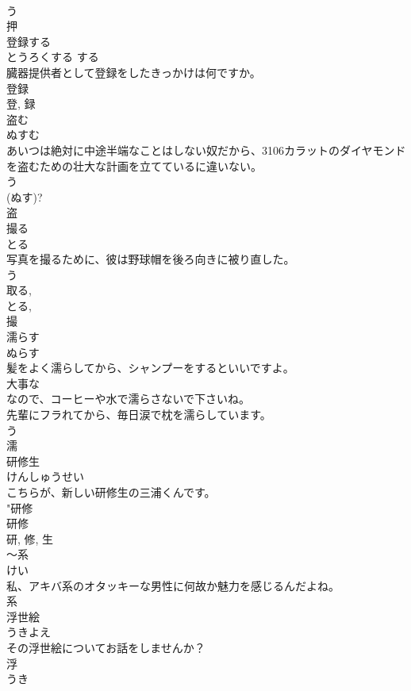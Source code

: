 \documentclass[8pt]{extreport}
\begin{document}
\begin{CJK}{UTF8}{min}
\\	う 
\\	押	
\\	登録する	
\\	とうろくする	する 
\\	臓器提供者として登録をしたきっかけは何ですか。	
\\	登録 
\\	登, 録	
\\	盗む	
\\	ぬすむ	
\\	あいつは絶対に中途半端なことはしない奴だから、3106カラットのダイヤモンドを盗むための壮大な計画を立てているに違いない。	
\\	う 
\\	(ぬす)? 
\\	盗	
\\	撮る	
\\	とる	
\\	写真を撮るために、彼は野球帽を後ろ向きに被り直した。	
\\	う 
\\	取る, 
\\	とる, 
\\	撮	
\\	濡らす	
\\	ぬらす	
\\	髪をよく濡らしてから、シャンプーをするといいですよ。	
\\	大事な
\\	なので、コーヒーや水で濡らさないで下さいね。	
\\	先輩にフラれてから、毎日涙で枕を濡らしています。	
\\	う 
\\	濡	
\\	研修生	
\\	けんしゅうせい	
\\	こちらが、新しい研修生の三浦くんです。	
\\	"研修 
\\	研修 
\\	研, 修, 生	
\\	〜系	
\\	けい	
\\	私、アキバ系のオタッキーな男性に何故か魅力を感じるんだよね。	
\\	系	
\\	浮世絵	
\\	うきよえ	
\\	その浮世絵についてお話をしませんか？	
\\	浮 
\\	うき 

\end{CJK}
\end{document}
